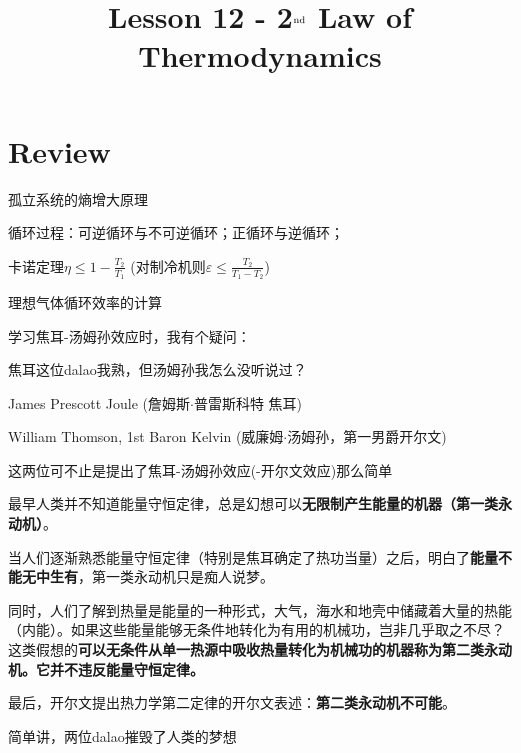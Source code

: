 \documentclass[CJK]{beamer}
\title{Lesson 12 - 2$^{\rm nd}$ Law of Thermodynamics}
\author{}
\date{}
\begin{document}

\section{Review}

\begin{frame}
\bch 
\bitem
\item{孤立系统的熵增大原理}
\item{循环过程：可逆循环与不可逆循环；正循环与逆循环；}
\item{卡诺定理$\eta \le 1 -\frac{T_2}{T_1}$ (对制冷机则$\varepsilon \le \frac{T_2}{T_1-T_2}$)}
\item{理想气体循环效率的计算}
\eitem
\ech
\end{frame}

\begin{frame}
\bch
学习焦耳-汤姆孙效应时，我有个疑问：

\skiplines

焦耳这位dalao我熟，但汤姆孙我怎么没听说过？

\ech
\end{frame}

\begin{frame}
\bch
\bitem
\item{James Prescott Joule (詹姆斯$\cdot$普雷斯科特 焦耳)

}
\item{William Thomson, 1st Baron Kelvin (威廉姆$\cdot$汤姆孙，第一男爵开尔文)

}
\eitem
这两位可不止是提出了焦耳-汤姆孙效应(-开尔文效应)那么简单
\ech
\end{frame}



\begin{frame}
\bch
\bitem
\item{最早人类并不知道能量守恒定律，总是幻想可以{\bf 无限制产生能量的机器（第一类永动机）}。}
\item{当人们逐渐熟悉能量守恒定律（特别是焦耳确定了热功当量）之后，明白了{\bf 能量不能无中生有}，第一类永动机只是痴人说梦。}
\item{同时，人们了解到热量是能量的一种形式，大气，海水和地壳中储藏着大量的热能（内能）。如果这些能量能够无条件地转化为有用的机械功，岂非几乎取之不尽？这类假想的{\bf 可以无条件从单一热源中吸收热量转化为机械功的机器称为第二类永动机。它并不违反能量守恒定律。}}
\item{最后，开尔文提出热力学第二定律的开尔文表述：{\bf 第二类永动机不可能}。}
\eitem

简单讲，两位dalao摧毁了人类的梦想\wulian
\ech
\end{frame}
\end{document}
